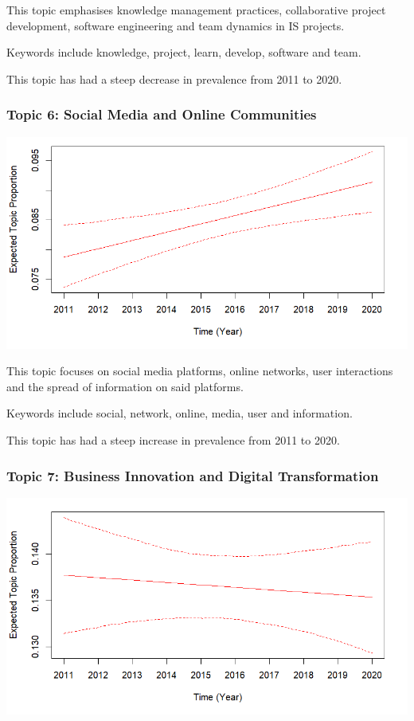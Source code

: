\documentclass[
  letterpaper,
  DIV=11,
  numbers=noendperiod]{scrartcl}
\begin{document}
This topic emphasises knowledge management practices, collaborative
project development, software engineering and team dynamics in IS
projects.

Keywords include knowledge, project, learn, develop, software and team.

This topic has had a steep decrease in prevalence from 2011 to 2020.

\hypertarget{topic-6-social-media-and-online-communities}{%
\subsubsection{Topic 6: Social Media and Online
Communities}\label{topic-6-social-media-and-online-communities}}

\includegraphics{images/topic6.png}

This topic focuses on social media platforms, online networks, user
interactions and the spread of information on said platforms.

Keywords include social, network, online, media, user and information.

This topic has had a steep increase in prevalence from 2011 to 2020.

\hypertarget{topic-7-business-innovation-and-digital-transformation}{%
\subsubsection{Topic 7: Business Innovation and Digital
Transformation}\label{topic-7-business-innovation-and-digital-transformation}}

\includegraphics{images/topic7.png}
\end{document}
